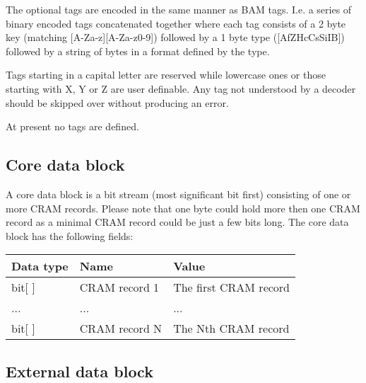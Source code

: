 \documentclass[a4paper]{article}
\begin{document}
The optional tags are encoded in the same manner as BAM tags.  I.e. a
series of binary encoded tags concatenated together where each tag
consists of a 2 byte key (matching [A-Za-z][A-Za-z0-9]) followed by a
1 byte type ([AfZHcCsSiIB]) followed by a string of bytes in a format
defined by the type.

Tags starting in a capital letter are reserved while lowercase ones or
those starting with X, Y or Z are user definable.  Any tag not
understood by a decoder should be skipped over without producing an
error.

At present no tags are defined.

%
% 


\subsection{\textbf{Core data block}}

A core data block is a bit stream (most significant bit first) consisting of one 
or more CRAM records. Please note that one byte could hold more then one CRAM record 
as a minimal CRAM record could be just a few bits long. The core data block has 
the following fields:

\begin{tabular}{|l|>{\raggedright}p{120pt}|>{\raggedright}p{260pt}|}
\hline
\textbf{Data type} & \textbf{Name} & \textbf{Value}
\tabularnewline
\hline
bit[ ] & CRAM record 1 & The first CRAM record\tabularnewline
\hline
... & ... & ...\tabularnewline
\hline
bit[ ] & CRAM record N & The Nth CRAM record \tabularnewline
\hline
\end{tabular}

\subsection{\textbf{External data block}}
\end{document}
